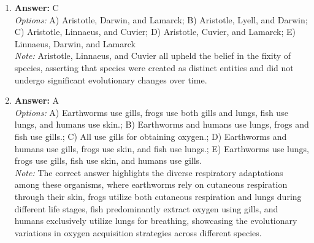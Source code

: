 \documentclass[12pt]{article}
\begin{document}
\begin{enumerate}[label=\arabic*.]
\item \textbf{Answer:} C
\\ \textit{Options:} A) Aristotle, Darwin, and Lamarck; B) Aristotle, Lyell, and Darwin; C) Aristotle, Linnaeus, and Cuvier; D) Aristotle, Cuvier, and Lamarck; E) Linnaeus, Darwin, and Lamarck
\\ \textit{Note:} Aristotle, Linnaeus, and Cuvier all upheld the belief in the fixity of species, asserting that species were created as distinct entities and did not undergo significant evolutionary changes over time.
\item \textbf{Answer:} A
\\ \textit{Options:} A) Earthworms use gills, frogs use both gills and lungs, fish use lungs, and humans use skin.; B) Earthworms and humans use lungs, frogs and fish use gills.; C) All use gills for obtaining oxygen.; D) Earthworms and humans use gills, frogs use skin, and fish use lungs.; E) Earthworms use lungs, frogs use gills, fish use skin, and humans use gills.
\\ \textit{Note:} The correct answer highlights the diverse respiratory adaptations among these organisms, where earthworms rely on cutaneous respiration through their skin, frogs utilize both cutaneous respiration and lungs during different life stages, fish predominantly extract oxygen using gills, and humans exclusively utilize lungs for breathing, showcasing the evolutionary variations in oxygen acquisition strategies across different species.
\end{enumerate}
\end{document}
